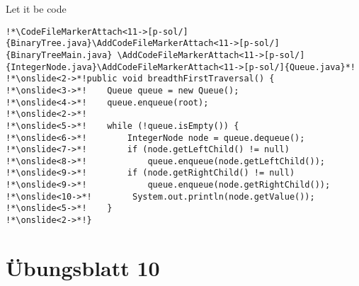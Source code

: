 \begin{frame}[fragile,c]{Let it be code}
\begin{verbatim}
!*\CodeFileMarkerAttach<11->[p-sol/]{BinaryTree.java}\AddCodeFileMarkerAttach<11->[p-sol/]{BinaryTreeMain.java} \AddCodeFileMarkerAttach<11->[p-sol/]{IntegerNode.java}\AddCodeFileMarkerAttach<11->[p-sol/]{Queue.java}*!
!*\onslide<2->*!public void breadthFirstTraversal() {
!*\onslide<3->*!    Queue queue = new Queue();
!*\onslide<4->*!    queue.enqueue(root);
!*\onslide<2->*!
!*\onslide<5->*!    while (!queue.isEmpty()) {
!*\onslide<6->*!        IntegerNode node = queue.dequeue();
!*\onslide<7->*!        if (node.getLeftChild() != null)
!*\onslide<8->*!            queue.enqueue(node.getLeftChild());
!*\onslide<9->*!        if (node.getRightChild() != null)
!*\onslide<9->*!            queue.enqueue(node.getRightChild());
!*\onslide<10->*!        System.out.println(node.getValue());
!*\onslide<5->*!    }
!*\onslide<2->*!}
\end{verbatim}
\end{frame}

\section{Übungsblatt 10}
